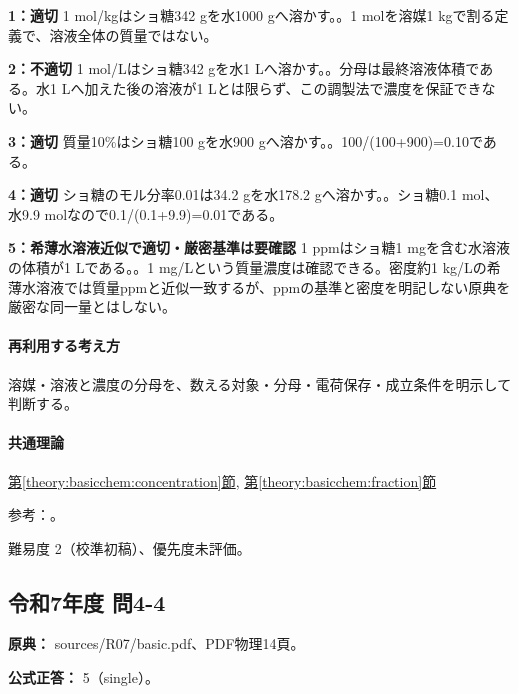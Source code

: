 \noindent\textbf{1：適切} 1 mol/kgはショ糖342 gを水1000 gへ溶かす。。1 molを溶媒1 kgで割る定義で、溶液全体の質量ではない。\par

\noindent\textbf{2：不適切} 1 mol/Lはショ糖342 gを水1 Lへ溶かす。。分母は最終溶液体積である。水1 Lへ加えた後の溶液が1 Lとは限らず、この調製法で濃度を保証できない。\par

\noindent\textbf{3：適切} 質量10\%はショ糖100 gを水900 gへ溶かす。。100/(100+900)=\allowbreak{}0.10である。\par

\noindent\textbf{4：適切} ショ糖のモル分率0.01は34.2 gを水178.2 gへ溶かす。。ショ糖0.1 mol、水9.9 molなので0.1/(0.1+9.9)=\allowbreak{}0.01である。\par

\noindent\textbf{5：希薄水溶液近似で適切・厳密基準は要確認} 1 ppmはショ糖1 mgを含む水溶液の体積が1 Lである。。1 mg/Lという質量濃度は確認できる。密度約1 kg/Lの希薄水溶液では質量ppmと近似一致するが、ppmの基準と密度を明記しない原典を厳密な同一量とはしない。\par

\paragraph{再利用する考え方} 溶媒・溶液と濃度の分母を、数える対象・分母・電荷保存・成立条件を明示して判断する。

\paragraph{共通理論} \hyperref[theory:basicchem:concentration]{第\ref*{theory:basicchem:concentration}節}, \hyperref[theory:basicchem:fraction]{第\ref*{theory:basicchem:fraction}節}

\par 参考：\cite{iupac_amount_concentration,iupac_molality,iupac_amount_fraction}。

\par 難易度 2（校準初稿）、優先度未評価。

\subsection{令和7年度 問4-4}
\label{q:r07-reg-basic-4-4}

\noindent\textbf{原典：} sources/R07/basic.pdf、PDF物理14頁。

\textbf{公式正答：} 5（single）。

